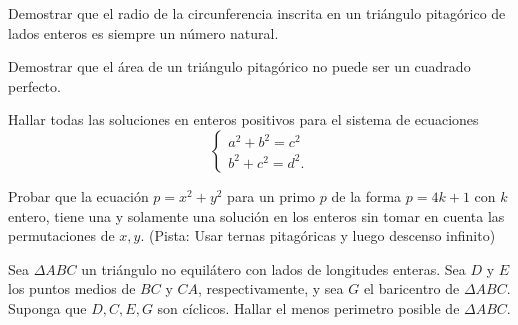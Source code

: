 \begin{problem}
    Demostrar que el radio de la circunferencia inscrita en un triángulo pitagórico de lados enteros es siempre un número natural.
\end{problem}

\begin{problem}
    Demostrar que el área de un triángulo pitagórico no puede ser un cuadrado perfecto.
\end{problem}

\begin{problem}
    Hallar todas las soluciones en enteros positivos para el sistema de ecuaciones
    \[
        \begin{cases}
            a^2 + b^2 = c^2\\
            b^2 + c^2 = d^2.
        \end{cases}
    \]
\end{problem}

\begin{problem}
    Probar que la ecuación $p = x^2 + y^2$ para un primo $p$ de la forma $p = 4k + 1$ con $k$ entero, tiene una y
    solamente una solución en los enteros sin tomar en cuenta las permutaciones de $x,y$.
    (Pista: Usar ternas pitagóricas y luego descenso infinito)
\end{problem}

\begin{problem}
    Sea $\Delta ABC$ un triángulo no equilátero con lados de longitudes enteras.
    Sea $D$ y $E$ los puntos medios de $BC$ y $CA$, respectivamente, y sea $G$ el baricentro de $\Delta ABC$.
    Suponga que $D,C,E, G$ son cíclicos.
    Hallar el menos perimetro posible de $\Delta ABC$.
\end{problem}